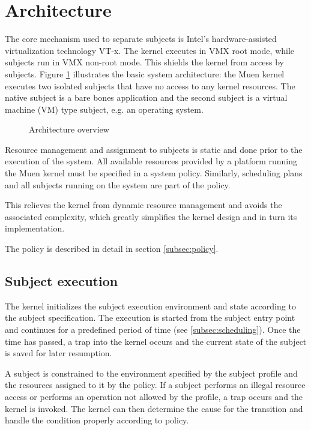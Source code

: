 \section{Architecture}
The core mechanism used to separate subjects is Intel's hardware-assisted
virtualization technology VT-x. The kernel executes in VMX root mode, while
subjects run in VMX non-root mode. This shields the kernel from access by
subjects. Figure \ref{fig:architecture-overview} illustrates the basic system
architecture: the Muen kernel executes two isolated subjects that have no
access to any kernel resources. The native subject is a bare bones application
and the second subject is a virtual machine (VM) type subject, e.g. an
operating system.

\begin{figure}[h]
	\centering
	
	\caption{Architecture overview}
	\label{fig:architecture-overview}
\end{figure}

Resource management and assignment to subjects is static and done prior to the
execution of the system. All available resources provided by a platform running
the Muen kernel must be specified in a system policy. Similarly, scheduling
plans and all subjects running on the system are part of the policy.

This relieves the kernel from dynamic resource management and avoids the
associated complexity, which greatly simplifies the kernel design and in turn
its implementation.

The policy is described in detail in section \ref{subsec:policy}.

\subsection{Subject execution}
The kernel initializes the subject execution environment and state according to
the subject specification. The execution is started from the subject entry point
and continues for a predefined period of time (see \ref{subsec:scheduling}).
Once the time has passed, a trap into the kernel occurs and the current state of
the subject is saved for later resumption.

A subject is constrained to the environment specified by the subject profile and
the resources assigned to it by the policy. If a subject performs an illegal
resource access or performs an operation not allowed by the profile, a trap
occurs and the kernel is invoked. The kernel can then determine the cause for
the transition and handle the condition properly according to policy.


